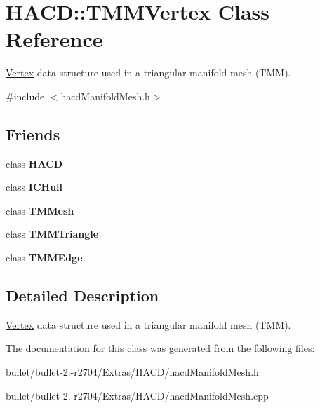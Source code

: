 \hypertarget{class_h_a_c_d_1_1_t_m_m_vertex}{\section{H\+A\+C\+D\+:\+:T\+M\+M\+Vertex Class Reference}
\label{class_h_a_c_d_1_1_t_m_m_vertex}
}


\hyperlink{struct_vertex}{Vertex} data structure used in a triangular manifold mesh (T\+M\+M).  




{\ttfamily \#include $<$hacd\+Manifold\+Mesh.\+h$>$}

\subsection*{Friends}
\begin{DoxyCompactItemize}
\item 
\hypertarget{class_h_a_c_d_1_1_t_m_m_vertex_ab3497bc7797561d0c79ecef2f462e43a}{class {\bfseries H\+A\+C\+D}}\label{class_h_a_c_d_1_1_t_m_m_vertex_ab3497bc7797561d0c79ecef2f462e43a}

\item 
\hypertarget{class_h_a_c_d_1_1_t_m_m_vertex_af8c54a3b946020c72439a823fc62e570}{class {\bfseries I\+C\+Hull}}\label{class_h_a_c_d_1_1_t_m_m_vertex_af8c54a3b946020c72439a823fc62e570}

\item 
\hypertarget{class_h_a_c_d_1_1_t_m_m_vertex_a444d6b56620e89d598962bee57ddd380}{class {\bfseries T\+M\+Mesh}}\label{class_h_a_c_d_1_1_t_m_m_vertex_a444d6b56620e89d598962bee57ddd380}

\item 
\hypertarget{class_h_a_c_d_1_1_t_m_m_vertex_ac66cabe598df0738b39a09449de0faad}{class {\bfseries T\+M\+M\+Triangle}}\label{class_h_a_c_d_1_1_t_m_m_vertex_ac66cabe598df0738b39a09449de0faad}

\item 
\hypertarget{class_h_a_c_d_1_1_t_m_m_vertex_a5f453e8c231c9e8cf5bcd76e8e569b2d}{class {\bfseries T\+M\+M\+Edge}}\label{class_h_a_c_d_1_1_t_m_m_vertex_a5f453e8c231c9e8cf5bcd76e8e569b2d}

\end{DoxyCompactItemize}


\subsection{Detailed Description}
\hyperlink{struct_vertex}{Vertex} data structure used in a triangular manifold mesh (T\+M\+M). 

The documentation for this class was generated from the following files\+:\begin{DoxyCompactItemize}
\item 
bullet/bullet-\/2.-\/r2704/\+Extras/\+H\+A\+C\+D/hacd\+Manifold\+Mesh.\+h\item 
bullet/bullet-\/2.-\/r2704/\+Extras/\+H\+A\+C\+D/hacd\+Manifold\+Mesh.\+cpp\end{DoxyCompactItemize}

